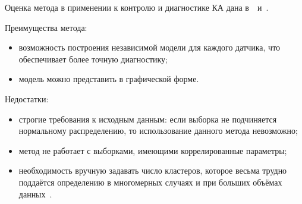 Оценка метода в применении к контролю и диагностике КА дана в~\cite{MartinCompUnsupervisedDetectionMethods}~и~\cite{MartinUnsupervisedAnomDetectForLiquid}.

Преимущества метода:
\begin{itemize}
	\item возможность построения независимой модели для каждого датчика, что обеспечивает более точную диагностику;
	\item модель можно представить в графической форме.
\end{itemize}

Недостатки:
\begin{itemize}
	\item строгие требования к исходным данным: если выборка не подчиняется нормальному распределению, то использование данного метода невозможно;
	\item метод не работает с выборками, имеющими коррелированные параметры;
	\item необходимость вручную задавать число кластеров, которое весьма трудно поддаётся определению в многомерных случаях и при больших объёмах данных~\cite{MartinUnsupervisedAnomDetectForLiquid}.
\end{itemize}